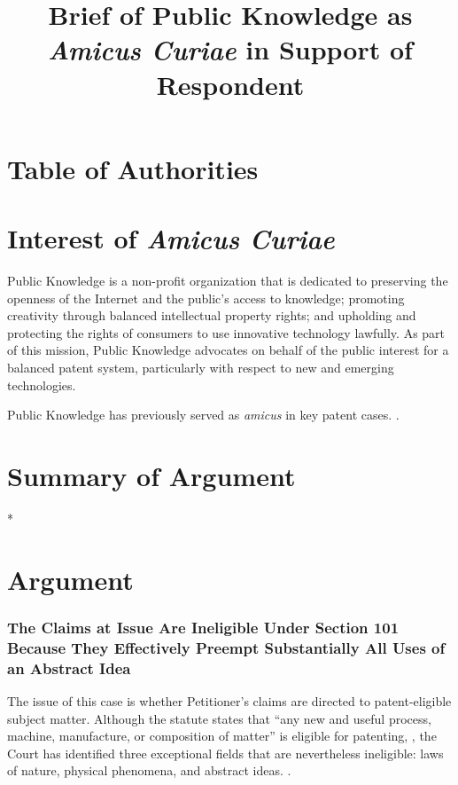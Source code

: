 \documentclass{scotus}
\title{Brief of Public Knowledge as
\protect\\\emph{Amicus Curiae} in Support of Respondent}
\def\amicus{\emph{amicus}\xspace}
\begin{document}
\maketitle

\romanpagenumbers
\tableofcontents

\part{Table of Authorities}

\tableofauthorities

\clearpage
\arabicpagenumbers

\part{Interest of \emph{Amicus Curiae}}

Public Knowledge is a non-profit organization that is dedicated to preserving
the openness of the Internet and the public's access to knowledge; promoting
creativity through balanced intellectual property rights; and upholding and
protecting the rights of consumers to use innovative technology lawfully. As
part of this mission, Public Knowledge advocates on behalf of the public
interest for a balanced patent system, particularly with respect to new and
emerging technologies.

Public Knowledge has previously served as \amicus in key patent cases.
.


\part{Summary of Argument}

*

\part{Argument}

\section{The Claims at Issue Are Ineligible Under Section 101 Because They
Effectively Preempt Substantially All Uses of an Abstract Idea}

The issue of this case is whether Petitioner's claims are directed to
patent-eligible subject matter. Although the statute states that ``any new and
useful process, machine, manufacture, or composition of matter'' is eligible for
patenting, , the Court has identified three exceptional fields that
are nevertheless ineligible: laws of nature, physical phenomena, and abstract
ideas. .
\end{document}
